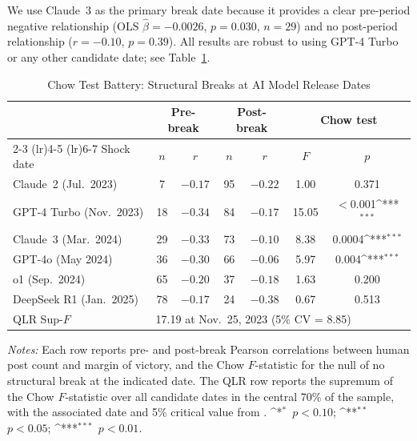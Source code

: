 \documentclass[12pt]{article}
\newcommand{\sym}[1]{\ifmmode^{#1}\else\(^{#1}\)\fi}
\begin{document}
We use Claude~3 as the primary break date because it provides a clear pre-period negative
relationship (OLS $\hat{\beta} = -0.0026$, $p = 0.030$, $n = 29$) and no post-period
relationship ($r = -0.10$, $p = 0.39$). All results are robust to using GPT-4 Turbo or any other candidate date; see Table~\ref{tab:chow_battery}.

\begin{table}[H]
\centering
\caption{Chow Test Battery: Structural Breaks at AI Model Release Dates}
\label{tab:chow_battery}
\begin{singlespace}
\begin{tabular}{lcccccc}
\toprule
 & \multicolumn{2}{c}{Pre-break} & \multicolumn{2}{c}{Post-break} & \multicolumn{2}{c}{Chow test} \\
\cmidrule(lr){2-3} \cmidrule(lr){4-5} \cmidrule(lr){6-7}
Shock date & $n$ & $r$ & $n$ & $r$ & $F$ & $p$ \\
\midrule
Claude~2 (Jul.\ 2023)   & 7   & $-0.17$ & 95  & $-0.22$ & 1.00 & 0.371 \\
GPT-4 Turbo (Nov.\ 2023)& 18  & $-0.34$ & 84  & $-0.17$ & 15.05 & $<$0.001\sym{***} \\
Claude~3 (Mar.\ 2024)   & 29  & $-0.33$ & 73  & $-0.10$ & 8.38 & 0.0004\sym{***} \\
GPT-4o (May 2024)       & 36  & $-0.30$ & 66  & $-0.06$ & 5.97 & 0.004\sym{***} \\
o1 (Sep.\ 2024)         & 65  & $-0.20$ & 37  & $-0.18$ & 1.63 & 0.200 \\
DeepSeek R1 (Jan.\ 2025)& 78  & $-0.17$ & 24  & $-0.38$ & 0.67 & 0.513 \\
\midrule
QLR Sup-$F$             & \multicolumn{6}{l}{17.19 at Nov.\ 25, 2023 (5\% CV = 8.85)} \\
\bottomrule
\end{tabular}
\begin{flushleft}
\small\textit{Notes:} Each row reports pre- and post-break Pearson correlations between
human post count and margin of victory, and the Chow $F$-statistic for the null of
no structural break at the indicated date. The QLR row reports the supremum of the
Chow $F$-statistic over all candidate dates in the central 70\% of the sample,
with the associated date and 5\% critical value from \citet{andrews1993}.
\sym{*}~$p < 0.10$; \sym{**}~$p < 0.05$; \sym{***}~$p < 0.01$.
\end{flushleft}
\end{singlespace}
\end{table}
\end{document}
